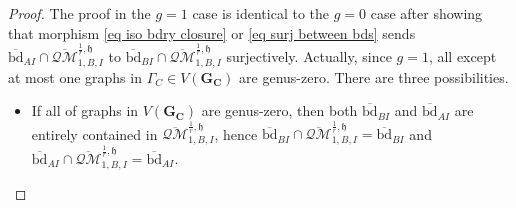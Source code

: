 \documentclass[11pt,a4paper]{article}
\theoremstyle{definition}
\theoremstyle{remark}
\newcommand{\oQMb}{{\overline{\mathcal{QM}}}}
\numberwithin{equation}{section}
\def\h{{\mathfrak h}}
\begin{document}
\begin{proof}
  
The proof in the $g=1$ case is identical to the $g=0$ case after showing that morphism \eqref{eq iso bdry closure} or \eqref{eq surj between bds} sends $\overline{\text{bd}}_{AI}\cap \oQMb^{\frac{1}{r},\h}_{1,B,I}$ to $\overline{\text{bd}}_{BI}\cap \oQMb^{\frac{1}{r},\h}_{1,B,I}$ surjectively. Actually, since $g=1$, all except at most one graphs in $\Gamma_C\in V(\mathbf{G_C})$ are genus-zero. There are three possibilities.
\begin{itemize}
    \item 
    If all of graphs in $V(\mathbf{G_C})$ are genus-zero, then both $\overline{\text{bd}}_{BI}$ and $\overline{\text{bd}}_{AI}$ are entirely contained in $ \oQMb^{\frac{1}{r},\h}_{1,B,I}$, hence $\overline{\text{bd}}_{BI}\cap \oQMb^{\frac{1}{r},\h}_{1,B,I}=\overline{\text{bd}}_{BI}$ and $\overline{\text{bd}}_{AI}\cap \oQMb^{\frac{1}{r},\h}_{1,B,I}=\overline{\text{bd}}_{AI}$. 
    

\end{itemize}
\end{proof}
\end{document}
